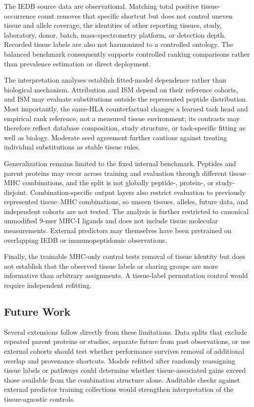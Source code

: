 The IEDB source data are observational. Matching total positive tissue-occurrence count removes that specific shortcut but does not control uneven tissue and allele coverage, the identities of other reporting tissues, study, laboratory, donor, batch, mass-spectrometry platform, or detection depth. Recorded tissue labels are also not harmonized to a controlled ontology. The balanced benchmark consequently supports controlled ranking comparisons rather than prevalence estimation or direct deployment.

The interpretation analyses establish fitted-model dependence rather than biological mechanism. Attribution and ISM depend on their reference cohorts, and ISM may evaluate substitutions outside the represented peptide distribution. Most importantly, the same-HLA counterfactual changes a learned task head and empirical rank reference, not a measured tissue environment; its contrasts may therefore reflect database composition, study structure, or task-specific fitting as well as biology. Moderate seed agreement further cautions against treating individual substitutions as stable tissue rules.

Generalization remains limited to the fixed internal benchmark. Peptides and parent proteins may recur across training and evaluation through different tissue--MHC combinations, and the split is not globally peptide-, protein-, or study-disjoint. Combination-specific output layers also restrict evaluation to previously represented tissue--MHC combinations, so unseen tissues, alleles, future data, and independent cohorts are not tested. The analysis is further restricted to canonical unmodified 9-mer MHC-I ligands and does not include tissue molecular measurements. External predictors may themselves have been pretrained on overlapping IEDB or immunopeptidomic observations.

Finally, the trainable MHC-only control tests removal of tissue identity but does not establish that the observed tissue labels or sharing groups are more informative than arbitrary assignments. A tissue-label permutation control would require independent refitting.

\subsection{Future Work}

Several extensions follow directly from these limitations. Data splits that exclude repeated parent proteins or studies, separate future from past observations, or use external cohorts should test whether performance survives removal of additional overlap and provenance shortcuts. Models refitted after randomly reassigning tissue labels or pathways could determine whether tissue-associated gains exceed those available from the combination structure alone. Auditable checks against external predictor training collections would strengthen interpretation of the tissue-agnostic controls.

